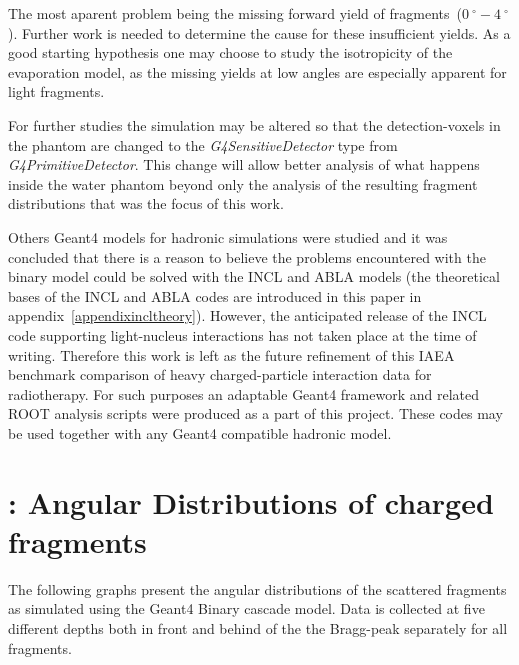 The most aparent problem being the missing forward yield of fragments~($0~^\circ-4~^\circ$). Further work is needed to determine the cause for these insufficient yields. As a good starting hypothesis one may choose to study the isotropicity of the evaporation model, as the missing yields at low angles are especially apparent for light fragments.

For further studies the simulation may be altered so that the detection-voxels in the phantom are changed to the \textit{G4SensitiveDetector} type from \textit{G4PrimitiveDetector}. This change will allow better analysis of what happens inside the water phantom beyond only the analysis of the resulting fragment distributions that was the focus of this work.

Others Geant4 models for hadronic simulations were studied and it was concluded that there is a reason to believe the problems encountered with the binary model could be solved with the INCL and ABLA models (the theoretical bases of the INCL and ABLA codes are introduced in this paper in appendix~\ref{appendixincltheory}). However, the anticipated release of the INCL code supporting light-nucleus interactions has not taken place at the time of writing. Therefore this work is left as the future refinement of this IAEA benchmark comparison of heavy charged-particle interaction data for radiotherapy. For such purposes an adaptable Geant4 framework and related ROOT analysis scripts were produced as a part of this project. These codes may be used together with any Geant4 compatible hadronic model.

\clearpage

  

\appendix 

\clearpage
{}
\section{\label{AppendixA}: Angular Distributions of charged fragments\label{AngularDistributionAppendix}}

The following graphs present the angular distributions of the scattered fragments as simulated using the Geant4 Binary cascade model. Data is collected at five different depths both in front and behind of the the Bragg-peak separately for all fragments.

\renewcommand{\theequation}{A\arabic{equation}}
\setcounter{equation}{0}  
\renewcommand{\thefigure}{A\arabic{figure}}
\setcounter{figure}{0}
\renewcommand{\thetable}{A\arabic{table}}
\setcounter{table}{0}
\renewcommand\thesection{A}
\setcounter{section}{1}

